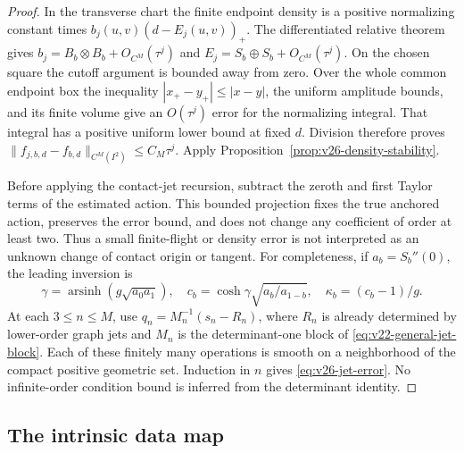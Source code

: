 \begin{proof}
In the transverse chart the finite endpoint density is a positive
normalizing constant times \(b_j(u,v)(d-E_j(u,v))_+\).  The differentiated
relative theorem gives
\(b_j=B_b\otimes B_b+O_{C^M}(\tau^j)\) and
\(E_j=S_b\oplus S_b+O_{C^M}(\tau^j)\).
On the chosen square the cutoff argument is bounded away from zero.
Over the whole common endpoint box the inequality
\(|x_+-y_+|\le|x-y|\), the uniform amplitude bounds, and its finite volume
give an \(O(\tau^j)\) error for the normalizing integral.  That integral
has a positive uniform lower bound at fixed \(d\).  Division therefore
proves \(\|f_{j,b,d}-f_{b,d}\|_{C^M(I^2)}\le C_M\tau^j\).
Apply Proposition~\ref{prop:v26-density-stability}.

Before applying the contact-jet recursion, subtract the zeroth and first
Taylor terms of the estimated action.  This bounded projection fixes the
true anchored action, preserves the error bound, and does not change any
coefficient of order at least two.  Thus a small finite-flight or density
error is not interpreted as an unknown change of contact origin or tangent.
For completeness, if \(a_b=S_b''(0)\), the leading inversion is
\[
 \gamma=\operatorname{arsinh}(g\sqrt{a_0a_1}),\quad
 c_b=\cosh\gamma\sqrt{a_b/a_{1-b}},\quad
 \kappa_b=(c_b-1)/g.
\]
At each \(3\le n\le M\), use
\(q_n=M_n^{-1}(s_n-R_n)\), where \(R_n\) is already determined by
lower-order graph jets and \(M_n\) is the determinant-one block of
\eqref{eq:v22-general-jet-block}.  Each of these finitely many operations is
smooth on a neighborhood of the compact positive geometric set.  Induction
in \(n\) gives \eqref{eq:v26-jet-error}.  No infinite-order condition bound
is inferred from the determinant identity.
\end{proof}

\subsection{The intrinsic data map}

